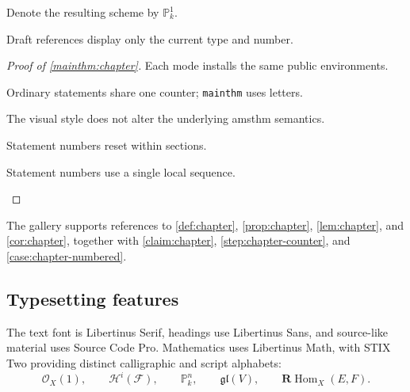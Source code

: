 \documentclass[sectionlevel=chapter,status=draft]{noteformyself}
\begin{document}
\begin{notation}[label=\labelNFM{not:chapter}]
  Denote the resulting scheme by \(\mathbb{P}^1_k\).
\end{notation}

\begin{remark}[
  title={About draft references},
  label=\labelNFM{rmk:chapter}
]
  Draft references display only the current type and number.
\end{remark}

\begin{proof}[Proof of \cref{mainthm:chapter}]
  Each mode installs the same public environments.

  \begin{step}\label{step:chapter-counter}
    Ordinary statements share one counter; \texttt{mainthm} uses letters.
  \end{step}

  \begin{claim}[label=\labelNFM{claim:chapter}]
    The visual style does not alter the underlying amsthm semantics.
  \end{claim}

  \begin{case}\label{case:chapter-numbered}
    Statement numbers reset within sections.
  \end{case}

  \begin{case}\label{case:chapter-standalone}
    Statement numbers use a single local sequence.
  \end{case}
\end{proof}

The gallery supports references to \cref{def:chapter}, \cref{prop:chapter},
\cref{lem:chapter}, and \cref{cor:chapter}, together with
\cref{claim:chapter}, \cref{step:chapter-counter}, and
\cref{case:chapter-numbered}.

\subsection[
  tag=0CH0203,
  label=\labelNFM{subsec:chapter-features}
]{Typesetting features}

The text font is Libertinus Serif, headings use Libertinus Sans, and source-like
material uses Source Code Pro. Mathematics uses Libertinus Math, with STIX Two
providing distinct calligraphic and script alphabets:
\[
  \mathcal{O}_X(1),\qquad
  \mathscr{H}^{i}(\mathscr{F}),\qquad
  \mathbb{P}^{n}_{k},\qquad
  \mathfrak{gl}(V),\qquad
  \mathbf{R}\!\operatorname{Hom}_{X}(E,F).
\]
\end{document}
